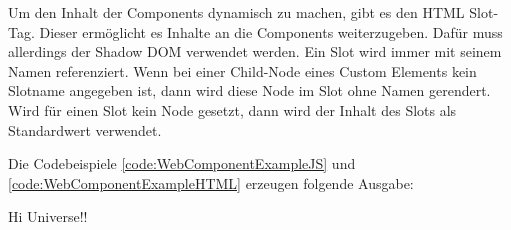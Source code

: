 

Um den Inhalt der Components dynamisch zu machen, gibt es den HTML Slot-Tag. Dieser ermöglicht es Inhalte an die Components weiterzugeben. Dafür muss allerdings der Shadow DOM verwendet werden. Ein Slot wird immer mit seinem Namen referenziert. Wenn bei einer Child-Node eines Custom Elements kein Slotname angegeben ist, dann wird diese Node im Slot ohne Namen gerendert. Wird für einen Slot kein Node gesetzt, dann wird der Inhalt des Slots als Standardwert verwendet. 
\cite{MDNSlots}

\pagebreak
{}




Die Codebeispiele \ref{code:WebComponentExampleJS} und \ref{code:WebComponentExampleHTML} erzeugen folgende Ausgabe:

{\ttfamily Hi Universe!!}